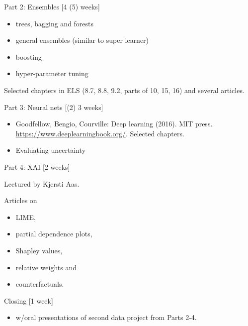 \documentclass[
  ignorenonframetext,
]{beamer}
\providecommand{\tightlist}{%
  \setlength{\itemsep}{0pt}\setlength{\parskip}{0pt}}
\begin{document}
\begin{frame}

\begin{block}{Part 2: Ensembles {[}4 (5) weeks{]}}

\begin{itemize}
\tightlist
\item
  trees, bagging and forests
\item
  general ensembles (similar to super learner)
\item
  boosting
\item
  hyper-parameter tuning
\end{itemize}

Selected chapters in ELS (8.7, 8.8, 9.2, parts of 10, 15, 16) and
several articles.

\end{block}

\begin{block}{Part 3: Neural nets {[}(2) 3 weeks{]}}

\begin{itemize}
\tightlist
\item
  Goodfellow, Bengio, Courville: Deep learning (2016). MIT press.
  \url{https://www.deeplearningbook.org/}. Selected chapters.
\item
  Evaluating uncertainty
\end{itemize}

\end{block}

\end{frame}

\begin{frame}

\begin{block}{Part 4: XAI {[}2 weeks{]}}

Lectured by Kjersti Aas.

Articles on

\begin{itemize}
\tightlist
\item
  LIME,
\item
  partial dependence plots,
\item
  Shapley values,
\item
  relative weights and
\item
  counterfactuals.
\end{itemize}

\end{block}

\begin{block}{Closing {[}1 week{]}}

\begin{itemize}
\tightlist
\item
  w/oral presentations of second data project from Parts 2-4.
\end{itemize}

\end{block}

\end{frame}
\end{document}
